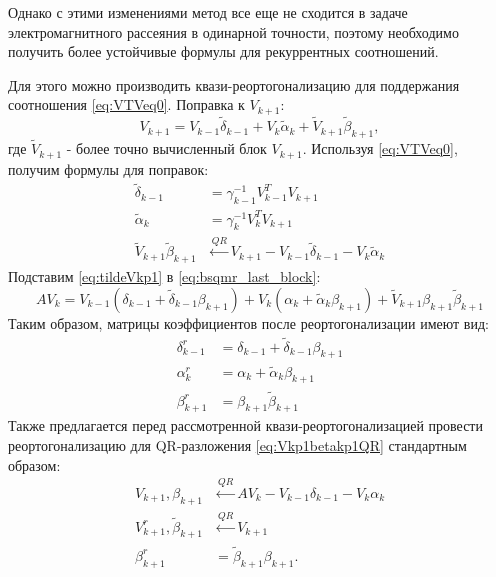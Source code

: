 
Однако с этими изменениями метод все еще не сходится в задаче электромагнитного 
рассеяния \cite{stavtsev2009application} в одинарной точности, поэтому необходимо 
получить более устойчивые формулы для рекуррентных соотношений. 

\par Для этого можно производить квази-реортогонализацию для поддержания соотношения \eqref{eq:VTVeq0}.
Поправка к $V_{k+1}$:
\begin{equation}
    \label{eq:tildeVkp1}
    V_{k+1} = V_{k-1} \tilde{\delta}_{k-1} + V_k \tilde{\alpha}_k + \tilde{V}_{k+1} \tilde{\beta}_{k+1},
\end{equation}
где $\tilde{V}_{k+1}$ - более точно вычисленный блок $V_{k+1}$. Используя \eqref{eq:VTVeq0}, получим формулы для поправок:
\begin{align}
    \tilde{\delta}_{k-1} &= \gamma_{k-1}^{-1} V_{k-1}^T V_{k+1} \label{eq:deltatilda} \\
    \tilde{\alpha}_{k}   &= \gamma_{k}^{-1} V_{k}^T V_{k+1} \label{eq:alphatilda} \\
    \tilde{V}_{k+1} \tilde{\beta}_{k+1} &\xleftarrow{QR} V_{k+1} - V_{k-1} \tilde{\delta}_{k-1} - V_{k} \tilde{\alpha}_k \label{rq:betatilda}
\end{align}
Подставим \eqref{eq:tildeVkp1} в \eqref{eq:bsqmr_last_block}:
\begin{equation}
    \label{eq:bsqmriterreorth}
    AV_{k} = V_{k-1} ( \delta_{k-1} + \tilde{\delta}_{k-1} \beta_{k+1}) + V_k (\alpha_k + \tilde{\alpha}_k \beta_{k+1}) + \tilde{V}_{k+1} \beta_{k+1} \tilde{\beta}_{k+1}
\end{equation} 
Таким образом, матрицы коэффициентов после реортогонализации имеют вид:
\begin{align}
    \delta_{k-1}^r &= \delta_{k-1} + \tilde{\delta}_{k-1} \beta_{k+1} \\
    \alpha_{k}^r   &= \alpha_k + \tilde{\alpha}_k \beta_{k+1} \\
    \beta_{k+1}^r  &= \beta_{k+1} \tilde{\beta}_{k+1}
\end{align}
Также предлагается перед рассмотренной квази-реортогонализацией провести реортогонализацию для
QR-разложения \eqref{eq:Vkp1betakp1QR} стандартным образом: 
\begin{align}
    V_{k+1}, \beta_{k+1} &\xleftarrow{QR} A V_k - V_{k-1} \delta_{k-1} - V_k \alpha_k \\
    V_{k+1}^r, \tilde{\beta}_{k+1} &\xleftarrow{QR} V_{k+1} \\
    \beta_{k+1}^r &= \tilde{\beta}_{k+1} \beta_{k+1}.
\end{align}

